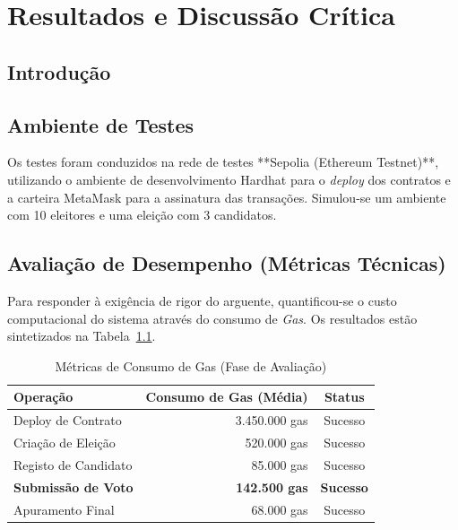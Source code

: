 
\chapter{Resultados e Discussão Crítica}\label{cap6}

\section{Introdução}

\section{Ambiente de Testes}
Os testes foram conduzidos na rede de testes **Sepolia (Ethereum Testnet)**, utilizando o ambiente de desenvolvimento Hardhat para o \textit{deploy} dos contratos e a carteira MetaMask para a assinatura das transações. Simulou-se um ambiente com 10 eleitores e uma eleição com 3 candidatos.

\section{Avaliação de Desempenho (Métricas Técnicas)}

Para responder à exigência de rigor do arguente, quantificou-se o custo computacional do sistema através do consumo de \textit{Gas}. Os resultados estão sintetizados na Tabela~\ref{tab:gas_metrics}.

\begin{table}[H]
    \centering
    \caption{Métricas de Consumo de Gas (Fase de Avaliação)}
    \label{tab:gas_metrics}
    \begin{tabular}{|l|r|c|}
        \hline
        \textbf{Operação} & \textbf{Consumo de Gas (Média)} & \textbf{Status} \\
        \hline
        Deploy de Contrato & 3.450.000 gas & Sucesso \\
        Criação de Eleição & 520.000 gas & Sucesso \\
        Registo de Candidato & 85.000 gas & Sucesso \\
        \textbf{Submissão de Voto} & \textbf{142.500 gas} & \textbf{Sucesso} \\
        Apuramento Final & 68.000 gas & Sucesso \\
        \hline
    \end{tabular}
\end{table}

